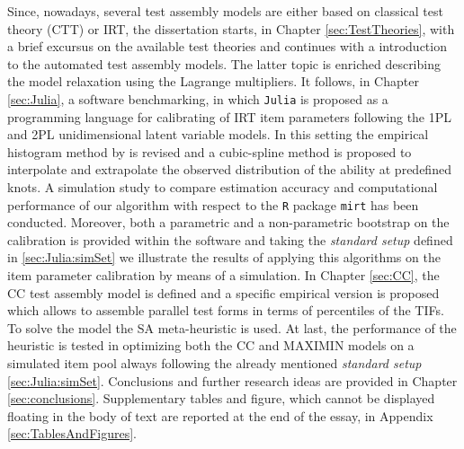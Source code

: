 Since, nowadays, several test assembly models are either based on classical test theory (CTT) or IRT, the dissertation starts, in Chapter \ref{sec:TestTheories}, with a brief excursus on the available test theories and continues with a introduction to the automated test assembly models.
The latter topic is enriched describing the model relaxation using the Lagrange multipliers.
It follows, in Chapter \ref{sec:Julia}, a software benchmarking, in which \texttt{Julia} is proposed as a programming language for calibrating of IRT item parameters following the 1PL and 2PL unidimensional latent variable models.
In this setting the empirical histogram method by \textcite{woods2007} is revised and a cubic-spline method is proposed to interpolate and extrapolate the observed distribution of the ability at predefined knots.
A simulation study to compare estimation accuracy and computational performance of our algorithm with respect to the \texttt{R} package \texttt{mirt} has been conducted.
Moreover, both a parametric and a non-parametric bootstrap on the calibration is provided within the software and taking the \emph{standard setup} defined in \ref{sec:Julia:simSet} we illustrate the results of applying this algorithms on the item parameter calibration by means of a simulation. 
In Chapter \ref{sec:CC}, the CC test assembly model is defined and a specific empirical version is proposed which allows to assemble parallel test forms in terms of percentiles of the TIFs.
To solve the model the SA meta-heuristic is used.
At last, the performance of the heuristic is tested in optimizing both the CC and MAXIMIN models on a simulated item pool always following the already mentioned \emph{standard setup} \ref{sec:Julia:simSet}.
Conclusions and further research ideas are provided in Chapter \ref{sec:conclusions}.
Supplementary tables and figure, which cannot be displayed floating in the body of text are reported at the end of the essay, in Appendix \ref{sec:TablesAndFigures}.

\color{black}

\tableofcontents
\pagebreak